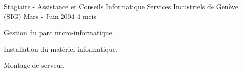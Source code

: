 \begin{cventries}
  \cventry
    {Stagiaire - Assistance et Conseils Informatique}
    {Services Industriels de Genève (SIG)}
    {Mars - Juin 2004}
    {4 mois}
    {
      \begin{cvitems}
        \item{Gestion du parc micro-informatique.}
        \item{Installation du matériel informatique.}
        \item{Montage de serveur.}
      \end{cvitems}
    }

\end{cventries}
